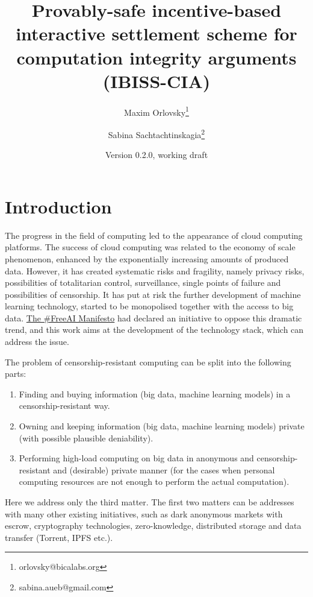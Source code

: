 \documentclass{article}
\title{Provably-safe incentive-based interactive settlement scheme for computation integrity arguments (IBISS-CIA)}
\author[1,2]{Maxim Orlovsky\thanks{orlovsky@bicalabs.org}}
\author[1,3]{Sabina Sachtachtinskagia\thanks{sabina.aueb@gmail.com}}
\affil[1]{Pandora Core AG, Switzerland}
\affil[2]{BICA Labs, Switzerland}
\affil[3]{Athens University of Economics and Business, Greece}
\date{Version 0.2.0, working draft}
\providecommand{\tightlist}{%
  \setlength{\itemsep}{0pt}%
  \setlength{\parskip}{0pt}%
  \setlength{\topsep}{0pt}}
\begin{document}
\maketitle

\section{Introduction}

The progress in the field of computing led to the appearance of cloud computing platforms. The success of cloud computing was related to the economy of scale phenomenon, enhanced by the exponentially increasing amounts of produced data. However, it has created systematic risks and fragility, namely privacy risks, possibilities of totalitarian control, surveillance, single points of failure and possibilities of censorship. It has put at risk the further development of machine learning technology, started to be monopolised together with the access to big data. \href{https://manifesto.ai}{The \#FreeAI Manifesto} had declared an initiative to oppose this dramatic trend, and this work aims at the development of the technology stack, which can address the issue.

The problem of censorship-resistant computing can be split into the following parts:
\begin{enumerate}[topsep=0pt]
\tightlist
    \item 
        Finding and buying information (big data, machine learning models) in a censorship-resistant way.
    \item
        Owning and keeping information (big data, machine learning models) private (with possible plausible deniability).
    \item
        Performing high-load computing on big data in anonymous and censorship-resistant and (desirable) private manner (for the cases when personal computing resources are not enough to perform the actual computation).
\end{enumerate}

Here we address only the third matter. The first two matters can be addresses with many other existing initiatives, such as dark anonymous markets with escrow, cryptography technologies, zero-knowledge, distributed storage and data transfer (Torrent, IPFS etc.).
\end{document}
